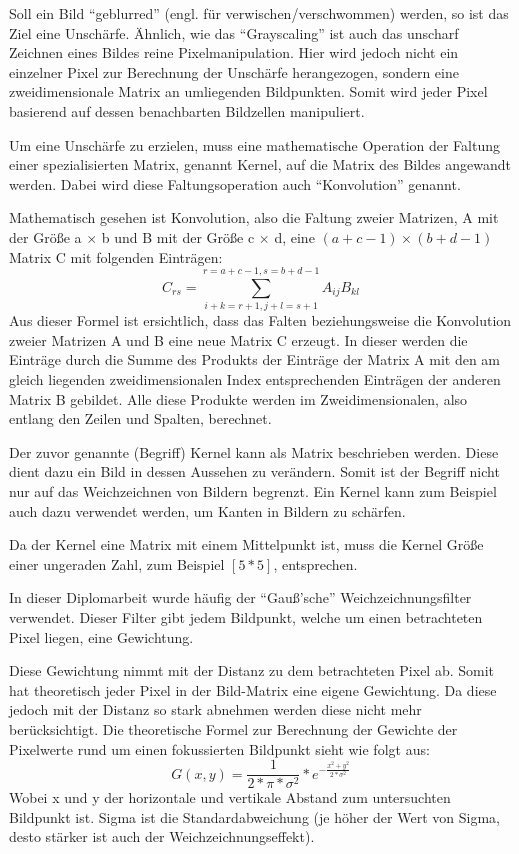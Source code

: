 Soll ein Bild ``geblurred'' (engl. für verwischen/verschwommen) werden, so ist das Ziel eine Unschärfe. Ähnlich, wie das ``Grayscaling'' ist auch das unscharf Zeichnen eines Bildes reine Pixelmanipulation. Hier wird jedoch nicht ein einzelner Pixel zur Berechnung der Unschärfe herangezogen, sondern eine zweidimensionale Matrix an umliegenden Bildpunkten. Somit wird jeder Pixel basierend auf dessen benachbarten Bildzellen manipuliert.

Um eine Unschärfe zu erzielen, muss eine mathematische Operation der Faltung einer spezialisierten Matrix, genannt Kernel, auf die Matrix des Bildes angewandt werden. Dabei wird diese Faltungsoperation auch ``Konvolution'' genannt.

Mathematisch gesehen ist Konvolution, also die Faltung zweier Matrizen, A mit der Größe a \(\times\) b und B mit der Größe c \(\times\) d, eine \((a + c -1) \times (b + d - 1)\) Matrix C mit folgenden Einträgen:
\[
  C_{ rs } = \sum_{i+k=r+1, j+l=s+1}^{r=a+c-1,s = b + d - 1} A_{ ij }B_{ kl }
\]
Aus dieser Formel ist ersichtlich, dass das Falten beziehungsweise die Konvolution zweier Matrizen A und B eine neue Matrix C erzeugt. In dieser werden die Einträge durch die Summe des Produkts der Einträge der Matrix A mit den am gleich liegenden zweidimensionalen Index entsprechenden Einträgen der anderen Matrix B gebildet. Alle diese Produkte werden im Zweidimensionalen, also entlang den Zeilen und Spalten, berechnet.

Der zuvor genannte (Begriff) Kernel kann als Matrix beschrieben werden. Diese dient dazu ein Bild in dessen Aussehen zu verändern. Somit ist der Begriff nicht nur auf das Weichzeichnen von Bildern begrenzt. Ein Kernel kann zum Beispiel auch dazu verwendet werden, um Kanten in Bildern zu schärfen.

Da der Kernel eine Matrix mit einem Mittelpunkt ist, muss die Kernel Größe einer ungeraden Zahl, zum Beispiel \([5*5]\), entsprechen.

In dieser Diplomarbeit wurde häufig der ``Gauß'sche'' Weichzeichnungsfilter verwendet. Dieser Filter gibt jedem Bildpunkt, welche um einen betrachteten Pixel liegen, eine Gewichtung.

Diese Gewichtung nimmt mit der Distanz zu dem betrachteten Pixel ab. Somit hat theoretisch jeder Pixel in der Bild-Matrix eine eigene Gewichtung. Da diese jedoch mit der Distanz so stark abnehmen werden diese nicht mehr berücksichtigt. Die theoretische Formel zur Berechnung der Gewichte der Pixelwerte rund um einen fokussierten Bildpunkt sieht wie folgt aus:
\[
  G(x,y)=\frac{ 1 }{ 2*\pi*\sigma^2 }*e^{ - \frac{ x^2 + y^2 }{ 2*\sigma^2 } }
\]
Wobei x und y der horizontale und vertikale Abstand zum untersuchten Bildpunkt ist. Sigma ist die Standardabweichung (je höher der Wert von Sigma, desto stärker ist auch der Weichzeichnungseffekt).

